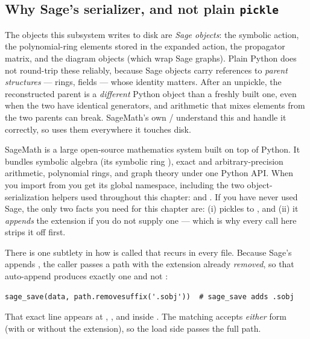 \subsection{Why Sage's serializer, and not plain \texttt{pickle}}

The objects this subsystem writes to disk are \emph{Sage objects}: the
symbolic action, the polynomial-ring elements stored in the expanded action,
the propagator matrix, and the diagram objects (which wrap Sage graphs). Plain
Python  does not round-trip these reliably, because Sage objects
carry references to \emph{parent structures} --- rings, fields --- whose
identity matters. After an unpickle, the reconstructed parent is a
\emph{different} Python object than a freshly built one, even when the two have
identical generators, and arithmetic that mixes elements from the two parents
can break. SageMath's own / understand this and handle it
correctly, so \Daedalus{} uses them everywhere it touches disk.

\begin{note}
SageMath is a large open-source mathematics system built on top of Python. It
bundles symbolic algebra (its symbolic ring ), exact and
arbitrary-precision arithmetic, polynomial rings, and graph theory under one
Python API. When you import from  you get its global namespace,
including the two object-serialization helpers used throughout this chapter:
 and . If you have never used Sage, the only two facts
you need for this chapter are: (i)  pickles
 to , and (ii) it \emph{appends} the 
extension if you do not supply one --- which is why every call here strips it
off first.
\end{note}

There is one subtlety in how  is called that recurs in every file.
Because Sage's  appends , the caller passes a path with
the extension already \emph{removed}, so that auto-append produces exactly one
 and not :

\begin{lstlisting}
sage_save(data, path.removesuffix('.sobj'))  # sage_save adds .sobj
\end{lstlisting}

That exact line appears at ,
, and inside . The
matching  accepts \emph{either} form (with or without
the extension), so the load side passes the full  path.

